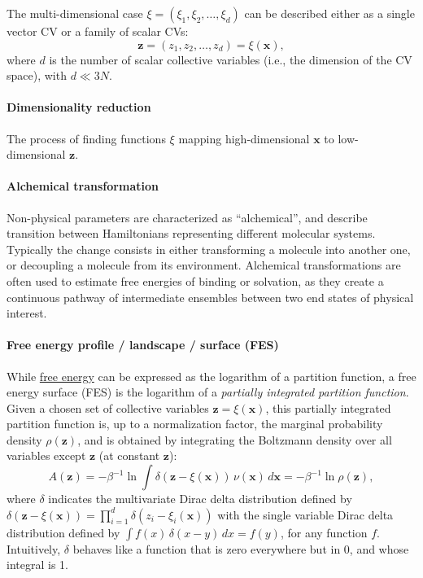 \documentclass[9pt,review]{livecoms}
\newcommand{\vx}{\mathbf{x}}
\newcommand{\vz}{\mathbf{z}}
\begin{document}
The multi-dimensional case $\xi= (\xi_1,\xi_2,\ldots,\xi_d)$ can be described either as a single vector CV or a family of scalar CVs:
\begin{equation}
\vz = (z_1, z_2, \ldots, z_d) = \xi(\vx),
\end{equation}
where $d$ is the number of scalar collective variables (i.e., the dimension of the CV space), with $d\ll 3N$.


\hypertarget{ref:DimRed} {\paragraph{Dimensionality reduction}}
The process of finding functions $\xi$ mapping high-dimensional $\vx$ to low-dimensional $\vz$.

\hypertarget{ref:Alchemical} {\paragraph{Alchemical transformation}}
Non-physical parameters are characterized as ``alchemical'', and describe transition between Hamiltonians representing different molecular systems. Typically the change consists in either transforming a molecule into another one, or decoupling a molecule from its environment. Alchemical transformations are often used to estimate free energies of binding or solvation, as they create a continuous pathway of intermediate ensembles between two end states of physical interest.

\hypertarget{ref:FES} {\paragraph{Free energy profile / landscape / surface (FES)}}
\label{sec:FES}
While \hyperlink{ref:FE} {free energy} can be expressed as the logarithm of a partition function, a free energy surface (FES) is the logarithm of a \textit{partially integrated partition function}.
Given a chosen set of collective variables $\vz = \xi(\vx)$, this partially integrated partition function is, up to a normalization factor, the marginal probability density $\rho(\vz)$, and is obtained by integrating the Boltzmann density over all variables except $\vz$ (at constant $\vz$):
\begin{equation}
\label{eq:fes_definition}
    A(\vz) = -\beta^{-1} \ln \int
    \delta\left(\vz-\xi(\vx)\right) \, \nu(\vx)\, d\vx
    = -\beta^{-1} \ln \rho(\vz) ,
\end{equation}
where $\delta$ indicates the multivariate Dirac delta distribution defined by $\delta\left(\vz-\xi(\vx)\right)= \prod_{i=1}^{d} \delta\left(z_i-\xi_i(\vx)\right)$ with the single variable Dirac delta distribution defined by $\int f(x) \, \delta(x-y) \,  dx = f(y)$, for any function $f$. Intuitively, $\delta$ behaves like a function that is zero everywhere but in 0, and whose integral is 1.
\end{document}
